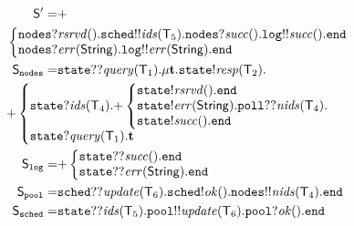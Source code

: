 \begin{align*}
\ST' = &
{+}\\
& \hspace{-14mm}
\left\{
\begin{array}{@{}l@{}}
\mathtt{nodes}{?}\mathit{rsrvd}().\mathtt{sched}{!!}\mathit{ids}(\T_5).\mathtt{nodes}{?}\mathit{succ}().\mathtt{log}{!!}\mathit{succ}().\tend\\
\mathtt{nodes}{?}\mathit{err}(\mathsf{String}).\mathtt{log}{!!}\mathit{err}(\mathsf{String}).\tend
\end{array} \right.\\
%
\ST_\mathtt{nodes} =  &
\mathtt{state}{??}\mathit{query}(\T_1).
\mu \ty.
\mathtt{state}{!}\mathit{resp}(\T_2).\\
& \hspace{-14mm}
{+}
\left\{
\begin{array}{@{}l@{}}
\mathtt{state}{?}\mathit{ids}(\T_4).
{+}\left\{
\begin{array}{@{}l@{}}
\mathtt{state}{!}\mathit{rsrvd}().\tend\\
\mathtt{state}{!}\mathit{err}(\mathsf{String}).\mathtt{poll}{??}\mathit{nids}(\T_4).\\
\mathtt{state}{!}\mathit{succ}().\tend
\end{array} \right.	\\
\mathtt{state}{?}\mathit{query}(\T_1).\ty
\end{array} \right.\\
%
\ST_\mathtt{log} =& 
{+}
\left\{
\begin{array}{@{}l@{}}
\mathtt{state}{??}\mathit{succ}().\tend\\
\mathtt{state}{??}\mathit{err}(\mathsf{String}).\tend
\end{array} \right.\\
%
\ST_\mathtt{pool} =&
\mathtt{sched}{??}\mathit{update}(\T_6).
\mathtt{sched}{!}\mathit{ok}(). 
\mathtt{nodes}{!!}\mathit{nids}(\T_4).\tend\\
\ST_\mathtt{sched} =& 
\mathtt{state}{??}\mathit{ids}(\T_5).
\mathtt{pool}{!!}\mathit{update}(\T_6).
\mathtt{pool}{?}\mathit{ok}().\tend
\end{align*}

